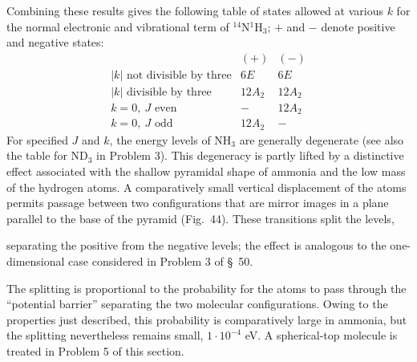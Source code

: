 Combining these results gives the following table of states allowed at various $k$ for the normal electronic and vibrational term of ${}^{14}\mathrm N{}^1\mathrm H_3$; $+$ and $-$ denote positive and negative states:
\[
\begin{array}{l|cc}
 &(+)&(-)\\\hline
|k|\text{ not divisible by three}&6E&6E\\
|k|\text{ divisible by three}&12A_2&12A_2\\
k=0,\ J\text{ even}&-&12A_2\\
k=0,\ J\text{ odd}&12A_2&-
\end{array}
\]
For specified $J$ and $k$, the energy levels of $\mathrm{NH}_3$ are generally degenerate (see also the table for $\mathrm{ND}_3$ in Problem 3). This degeneracy is partly lifted by a distinctive effect associated with the shallow pyramidal shape of ammonia and the low mass of the hydrogen atoms. A comparatively small vertical displacement of the atoms permits passage between two configurations that are mirror images in a plane parallel to the base of the pyramid (Fig.~44). These transitions split the levels,

separating the positive from the negative levels; the effect is analogous to the one-dimensional case considered in Problem 3 of \S~50.

\setcounter{figure}{43}
\begin{figure}[ht]
\centering
{}
\caption{}
\end{figure}

The splitting is proportional to the probability for the atoms to pass through the ``potential barrier'' separating the two molecular configurations. Owing to the properties just described, this probability is comparatively large in ammonia, but the splitting nevertheless remains small, $1\cdot10^{-4}$ eV. A spherical-top molecule is treated in Problem 5 of this section.

